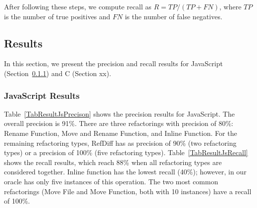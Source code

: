 After following these steps, we compute recall as $R = \mathit{TP} / (\mathit{TP} + \mathit{FN})$, where $\mathit{TP}$ is the number of true positives and $\mathit{FN}$ is the number of false negatives.


\subsection{Results}
\label{sec:eval:js:c:results}

In this section, we present the precision and recall results for JavaScript (Section~\ref{sec:eval:js:c:results:js}) and C (Section xx).

\subsubsection{JavaScript Results}
\label{sec:eval:js:c:results:js}

Table~\ref{TabResultJsPrecison} shows the precision results for JavaScript. The overall precision is 91\%. There are three refactorings with precision of 80\%: Rename Function, Move and Rename Function, and Inline Function. For the remaining refactoring types, RefDiff has as precision of 90\% (two refactoring types) or a precision of 100\% (five refactoring types). Table~\ref{TabResultJsRecall} shows the recall results, which reach 88\% when all refactoring types are considered together.
Inline function has the lowest recall (40\%); however, in our oracle has only five instances of this operation. The two most common refactorings (Move File and Move Function, both with 10 instances) have a recall of 100\%.




